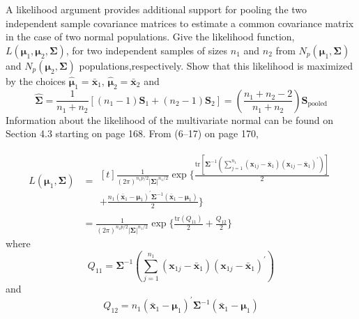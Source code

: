 A likelihood argument provides additional support for pooling the two independent
sample covariance matrices to estimate a common covariance matrix in the case of two
normal populations.
Give the likelihood function, $L(\bm{\mu}_{1}, \bm{\mu}_{2}, \bm{\Sigma})$, for two independent
samples of sizes $n_{1}$ and $n_{2}$ from $N_{p}(\bm{\mu}_{1}, \bm{\Sigma})$ and $N_{p}(\bm{\mu}_{2}, \bm{\Sigma})$ populations,respectively.
Show that this likelihood is maximized by the choices $\hat{\bm{\mu}}_{1} = \bar{\textbf{x}}_{1}$, $\hat{\bm{\mu}}_{2} = \bar{\textbf{x}}_{2}$ and
\[
    \hat{\bm{\Sigma}}
    =
    \frac{1}{n_{1} + n_{2}}
    \left[ (n_{1} - 1) \textbf{S}_{1} + (n_{2} - 1) \textbf{S}_{2} \right]
    =
    \left(
        \frac{n_{1} + n_{2} - 2}{n_{1} + n_{2}}
    \right)
    \textbf{S}_{\text{pooled}}
\]
Information about the likelihood of the multivariate normal can be found on Section 4.3 starting on page 168. From (6--17) on page 170,

\begin{align*}
    L(\bm{\mu}_{1}, \bm{\Sigma})
    & =
    \begin{multlined}[t]
        \frac{1}{{(2\pi)}^{n_{1}p/2}{|\bm{\Sigma}|}^{n_{1}/2}}
        \exp
        \Bigg\{
            \frac{
            \text{tr}
            \left[
                \bm{\Sigma}^{-1}
                \left(
                    \sum_{j=1}^{n_{1}}
                    (\textbf{x}_{1j} - \bar{\textbf{x}}_{1})
                    {(\textbf{x}_{1j} - \bar{\textbf{x}}_{1})}^{\prime}
                \right)
            \right]
            }{2} \\
            +
            \frac{
                n_{1}
                {(\bar{\textbf{x}}_{1} - \bm{\mu}_{1})}^{\prime}
                \bm{\Sigma}^{-1}
                (\bar{\textbf{x}}_{1} - \bm{\mu}_{1})
            }{2}
        \Bigg\}
    \end{multlined} \\
    & =
    \frac{1}{{(2\pi)}^{n_{1}p/2}{|\bm{\Sigma}|}^{n_{1}/2}}
        \exp
        \Bigg\{
            \frac{\text{tr}(Q_{11})}{2}
            +
            \frac{Q_{12}}{2}
        \Bigg\}
\end{align*}
where
\[
    Q_{11}
    =
    \bm{\Sigma}^{-1}
    \left(
        \sum_{j=1}^{n_{1}}
        (\textbf{x}_{1j} - \bar{\textbf{x}}_{1})
        {(\textbf{x}_{1j} - \bar{\textbf{x}}_{1})}^{\prime}
    \right)
\]
and
\[
    Q_{12}
    =
    n_{1}
    {(\bar{\textbf{x}}_{1} - \bm{\mu}_{1})}^{\prime}
    \bm{\Sigma}^{-1}
    (\bar{\textbf{x}}_{1} - \bm{\mu}_{1})
\]

